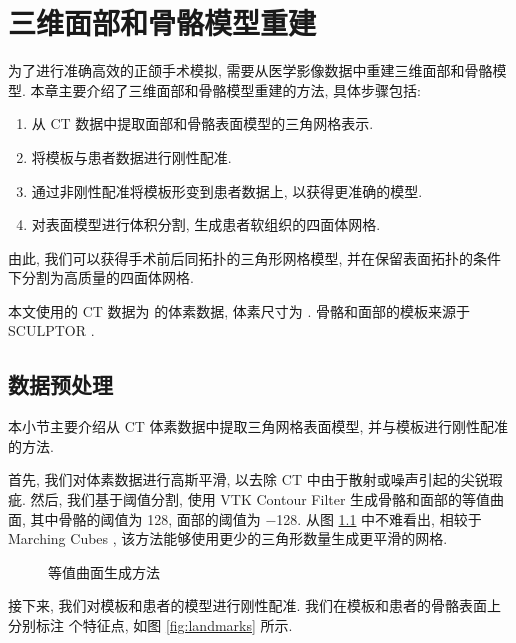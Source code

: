 
\chapter{三维面部和骨骼模型重建}

为了进行准确高效的正颌手术模拟, 需要从医学影像数据中重建三维面部和骨骼模型.
本章主要介绍了三维面部和骨骼模型重建的方法, 具体步骤包括:
\begin{enumerate}
  \item 从 CT 数据中提取面部和骨骼表面模型的三角网格表示.
  \item 将模板与患者数据进行刚性配准.
  \item 通过非刚性配准将模板形变到患者数据上, 以获得更准确的模型.
  \item 对表面模型进行体积分割, 生成患者软组织的四面体网格.
\end{enumerate}
由此, 我们可以获得手术前后同拓扑的三角形网格模型, 并在保留表面拓扑的条件下分割为高质量的四面体网格.

本文使用的 CT 数据为  的体素数据, 体素尺寸为 . 骨骼和面部的模板来源于 SCULPTOR \cite{qiuSCULPTORSkeletonconsistentFace2022a}.

\section{数据预处理}

本小节主要介绍从 CT 体素数据中提取三角网格表面模型, 并与模板进行刚性配准的方法.

首先, 我们对体素数据进行高斯平滑, 以去除 CT 中由于散射或噪声引起的尖锐瑕疵.
然后, 我们基于阈值分割, 使用 VTK Contour Filter 生成骨骼和面部的等值曲面, 其中骨骼的阈值为 \num{128}, 面部的阈值为 \num{-128}.
从图 \ref{fig:isosurface} 中不难看出, 相较于 Marching Cubes , 该方法能够使用更少的三角形数量生成更平滑的网格.

\begin{figure}
  \centering
  \caption{等值曲面生成方法}
  \label{fig:isosurface}
\end{figure}

接下来, 我们对模板和患者的模型进行刚性配准.
我们在模板和患者的骨骼表面上分别标注  个特征点, 如图 \ref{fig:landmarks} 所示.

